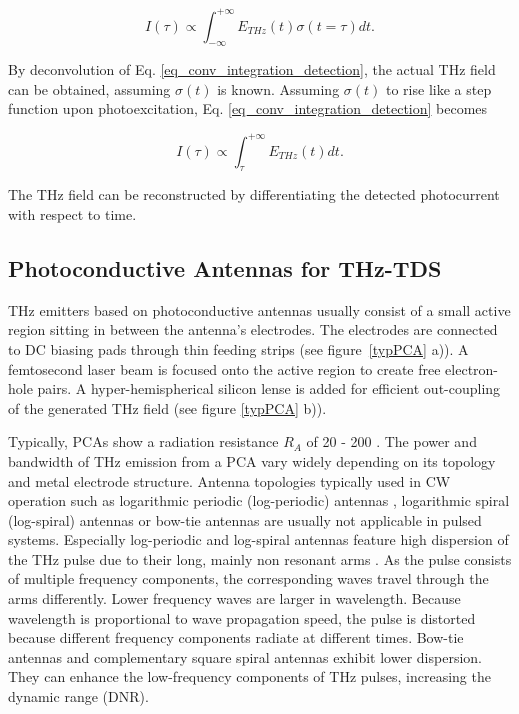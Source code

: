 \begin{equation}
	I(\tau) \propto \int_{-\infty}^{+\infty} E_{THz}(t)\sigma(t = \tau)dt.
	\label{eq_conv_integration_detection}
\end{equation}

By deconvolution of Eq. \ref{eq_conv_integration_detection}, the actual THz field can be obtained, assuming $\sigma(t)$ is known. Assuming $\sigma(t)$ to rise like a step function upon photoexcitation, Eq. \ref{eq_conv_integration_detection} becomes 

\begin{equation}
	I(\tau) \propto  \int_{\tau}^{+\infty} E_{THz}(t)dt.
\end{equation}

The THz field can be reconstructed by differentiating the detected photocurrent with respect to time. 



\subsection{Photoconductive Antennas for THz-TDS}
THz emitters based on photoconductive antennas usually consist of a small active region sitting in between the antenna's electrodes. The electrodes are connected to DC biasing pads through thin feeding strips (see figure~\ref{typPCA} a)). A femtosecond laser beam is focused onto the active region to create free electron-hole pairs. A hyper-hemispherical silicon lense is added for efficient out-coupling of the generated THz field (see figure \ref{typPCA} b)). 

Typically, PCAs show a radiation resistance $R_A$ of \num{20} - \num{200} \si{\Omega}. The power and bandwidth of THz emission from a PCA vary widely depending on its topology and metal electrode structure. Antenna topologies typically used in CW operation such as logarithmic periodic (log-periodic) antennas \cite{mendisTunableCWTHzSystem2004}, logarithmic spiral (log-spiral) \cite{linRoomtemperatureContinuouswaveTerahertz2025} antennas or bow-tie antennas \cite{PDFBowtieWideband} are usually not applicable in pulsed systems. Especially log-periodic and log-spiral antennas feature high dispersion of the THz pulse due to their long, mainly non resonant arms \cite{fernandezolveraDispersivePropertiesSelfcomplementary2017a}. As the pulse consists of multiple frequency components, the corresponding waves travel through the arms differently. Lower frequency waves are larger in wavelength. Because wavelength is proportional to wave propagation speed, the pulse is distorted because different frequency components radiate at different times. Bow-tie antennas and complementary square spiral antennas \cite{HighPowerGeneration} exhibit lower dispersion. They can enhance the low-frequency components of THz pulses, increasing the dynamic range (DNR). 

